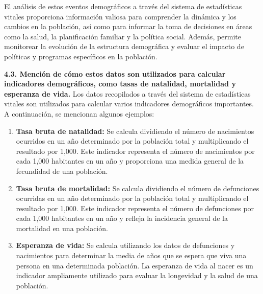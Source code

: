 \documentclass[8pt,a4paper]{beamer}
\begin{document}
{\begin{frame}{}
\begin{block}{}
\begin{enumerate}
\end{enumerate}
El análisis de estos eventos demográficos a través del sistema de estadísticas vitales proporciona información valiosa para comprender la dinámica y los cambios en la población, así como para informar la toma de decisiones en áreas como la salud, la planificación familiar y la política social. Además, permite monitorear la evolución de la estructura demográfica y evaluar el impacto de políticas y programas específicos en la población.
\end{block}
\end{frame}


\begin{frame}{}
\begin{block}{\textbf{4.3. Mención de cómo estos datos son utilizados para calcular indicadores demográficos, como tasas de natalidad, mortalidad y esperanza de vida.}}
\justifying
Los datos recopilados a través del sistema de estadísticas vitales son utilizados para calcular varios indicadores demográficos importantes. A continuación, se mencionan algunos ejemplos:
\begin{enumerate}
\justifying
\item[\ding{102}] \textbf{Tasa bruta de natalidad:} Se calcula dividiendo el número de nacimientos ocurridos en un año determinado por la población total y multiplicando el resultado por 1,000. Este indicador representa el número de nacimientos por cada 1,000 habitantes en un año y proporciona una medida general de la fecundidad de una población.
\item[\ding{102}] \textbf{Tasa bruta de mortalidad:} Se calcula dividiendo el número de defunciones ocurridas en un año determinado por la población total y multiplicando el resultado por 1,000. Este indicador representa el número de defunciones por cada 1,000 habitantes en un año y refleja la incidencia general de la mortalidad en una población.
\item[\ding{102}] \textbf{Esperanza de vida:} Se calcula utilizando los datos de defunciones y nacimientos para determinar la media de años que se espera que viva una persona en una determinada población. La esperanza de vida al nacer es un indicador ampliamente utilizado para evaluar la longevidad y la salud de una población.
\end{enumerate}
\end{block}
\end{frame}

\begin{frame}{}
\begin{block}{}
\justifying


\end{block}
\end{frame}}
\end{document}
